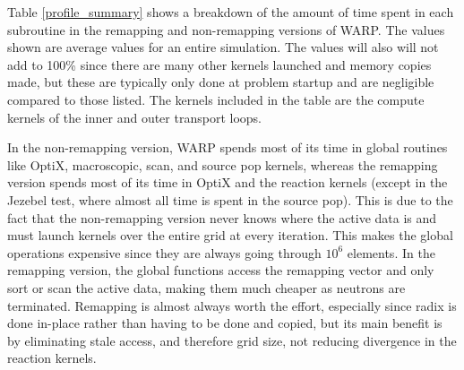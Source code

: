 Table \ref{profile_summary} shows a breakdown of the amount of time spent in each subroutine in the remapping and non-remapping versions of WARP.  The values shown are average values for an entire simulation.  The values will also will not add to 100\% since there are many other kernels launched and memory copies made, but these are typically only done at problem startup and are negligible compared to those listed.  The kernels included in the table are the compute kernels of the inner and outer transport loops.  

In the non-remapping version, WARP spends most of its time in global routines like OptiX, macroscopic, scan, and source pop kernels, whereas the remapping version spends most of its time in OptiX and the reaction kernels (except in the Jezebel test, where almost all time is spent in the source pop).  This is due to the fact that the non-remapping version never knows where the active data is and must launch kernels over the entire grid at every iteration.  This makes the global operations expensive since they are always going through $10^6$ elements.  In the remapping version, the global functions access the remapping vector and only sort or scan the active data, making them much cheaper as neutrons are terminated.  Remapping is almost always worth the effort, especially since radix is done in-place rather than having to be done and copied, but its main benefit is by eliminating stale access, and therefore grid size, not reducing divergence in the reaction kernels.  %




